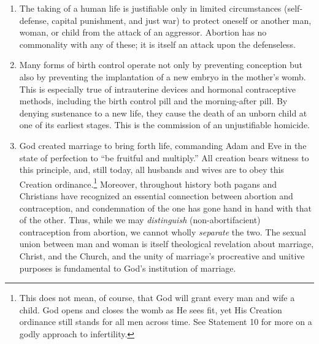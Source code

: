 \documentclass[
]{book}
\begin{document}
\begin{enumerate}
\def\labelenumi{\arabic{enumi}.}
\setcounter{enumi}{4}
\item
  The taking of a human life is justifiable only in limited circumstances (self-defense, capital punishment, and just war) to protect oneself or another man, woman, or child from the attack of an aggressor. Abortion has no commonality with any of these; it is itself an attack upon the defenseless.
\item
  Many forms of birth control operate not only by preventing conception but also by preventing the implantation of a new embryo in the mother's womb. This is especially true of intrauterine devices and hormonal contraceptive methods, including the birth control pill and the morning-after pill. By denying sustenance to a new life, they cause the death of an unborn child at one of its earliest stages. This is the commission of an unjustifiable homicide.
\item
  God created marriage to bring forth life, commanding Adam and Eve in the state of perfection to ``be fruitful and multiply.'' All creation bears witness to this principle, and, still today, all husbands and wives are to obey this Creation ordinance.\footnote{This does not mean, of course, that God will grant every man and wife a child. God opens and closes the womb as He sees fit, yet His Creation ordinance still stands for all men across time. See Statement 10 for more on a godly approach to infertility.} Moreover, throughout history both pagans and Christians have recognized an essential connection between abortion and contraception, and condemnation of the one has gone hand in hand with that of the other. Thus, while we may \emph{distinguish} (non-abortifacient) contraception from abortion, we cannot wholly \emph{separate} the two. The sexual union between man and woman is itself theological revelation about marriage, Christ, and the Church, and the unity of marriage's procreative and unitive purposes is fundamental to God's institution of marriage.
\end{enumerate}
\end{document}
